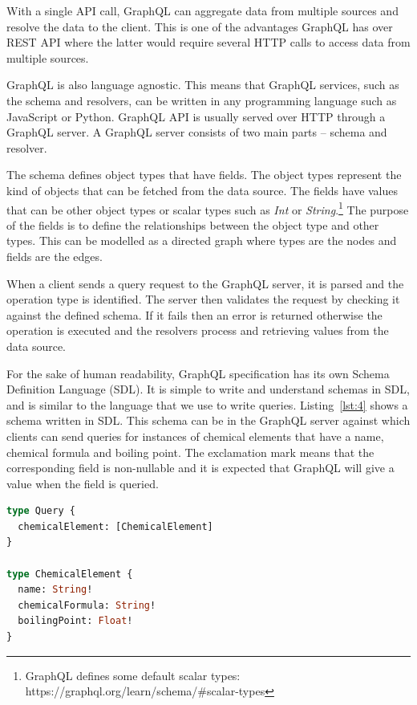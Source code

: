 With a single API call, GraphQL can aggregate data from multiple sources and resolve the data to the client. This is one of the advantages GraphQL has over REST API where the latter would require several HTTP calls to access data from multiple sources. 

GraphQL is also language agnostic. This means that GraphQL services, such as the schema and resolvers, can be written in any programming language such as JavaScript or Python. GraphQL API is usually served over HTTP through a GraphQL server. A GraphQL server consists of two main parts – schema and resolver. 

The schema defines object types that have fields. The object types represent the kind of objects that can be fetched from the data source. The fields have values that can be other object types or scalar types such as \textit{Int} or \textit{String}.\footnote{GraphQL defines some default scalar types: https://graphql.org/learn/schema/\#scalar-types} The purpose of the fields is to define the relationships between the object type and other types. This can be modelled as a directed graph where types are the nodes and fields are the edges. 

When a client sends a query request to the GraphQL server, it is parsed and the operation type is identified. The server then validates the request by checking it against the defined schema. If it fails then an error is returned otherwise the operation is executed and the resolvers process and retrieving values from the data source.

For the sake of human readability, GraphQL specification has its own Schema Definition Language (SDL). It is simple to write and understand schemas in SDL, and is similar to the language that we use to write queries. Listing~\ref{lst:4} shows a schema written in SDL. This schema can be in the GraphQL server against which clients can send queries for instances of chemical elements that have a name, chemical formula and boiling point. The exclamation mark means that the corresponding field is non-nullable and it is expected that GraphQL will give a value when the field is queried.

\begin{minipage}{\linewidth}
\begin{lstlisting}[label=lst:4, caption={A GraphQL Schema defined to query a chemical element}, language=GraphQL]
type Query {
  chemicalElement: [ChemicalElement]
}

type ChemicalElement {
  name: String!
  chemicalFormula: String!
  boilingPoint: Float!
}
\end{lstlisting}
\end{minipage}

